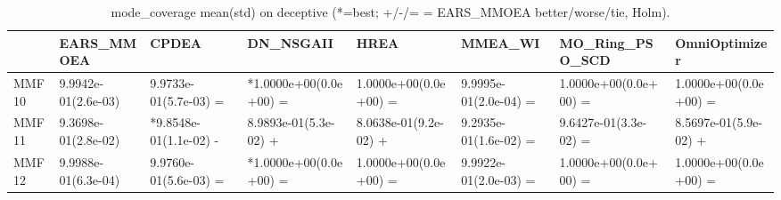\begin{table}[t]
\centering
\caption{mode_coverage mean(std) on deceptive (*=best; +/-/= = EARS_MMOEA better/worse/tie, Holm).}
\label{tab:deceptive_mode_coverage}
\begin{tabular}{llllllll}
\toprule
 & EARS\_MMOEA & CPDEA & DN\_NSGAII & HREA & MMEA\_WI & MO\_Ring\_PSO\_SCD & OmniOptimizer \\
\midrule
MMF10 & 9.9942e-01(2.6e-03) & 9.9733e-01(5.7e-03) = & *1.0000e+00(0.0e+00) = & 1.0000e+00(0.0e+00) = & 9.9995e-01(2.0e-04) = & 1.0000e+00(0.0e+00) = & 1.0000e+00(0.0e+00) = \\
MMF11 & 9.3698e-01(2.8e-02) & *9.8548e-01(1.1e-02) - & 8.9893e-01(5.3e-02) + & 8.0638e-01(9.2e-02) + & 9.2935e-01(1.6e-02) = & 9.6427e-01(3.3e-02) = & 8.5697e-01(5.9e-02) + \\
MMF12 & 9.9988e-01(6.3e-04) & 9.9760e-01(5.6e-03) = & *1.0000e+00(0.0e+00) = & 1.0000e+00(0.0e+00) = & 9.9922e-01(2.0e-03) = & 1.0000e+00(0.0e+00) = & 1.0000e+00(0.0e+00) = \\
\bottomrule
\end{tabular}
\end{table}
